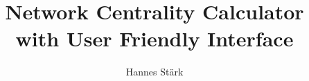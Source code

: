 \documentclass{article}
\title{Network Centrality Calculator with User Friendly Interface}
\author{Hannes St\"ark}
\begin{document}

    

    \pagebreak %
    \printbibliography
    
\end{document}
